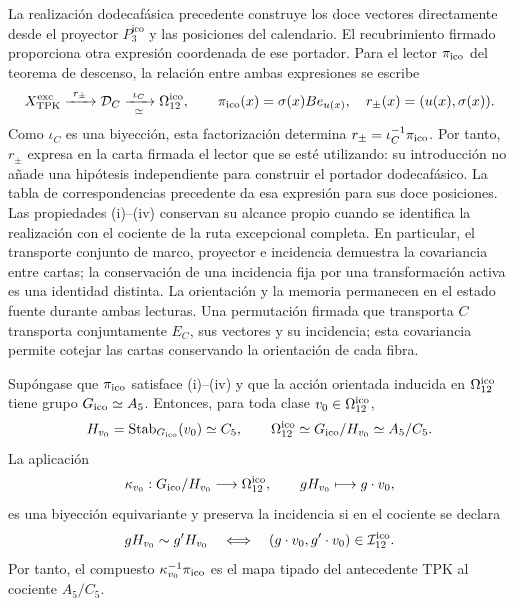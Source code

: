 La realización dodecafásica precedente construye los doce vectores
directamente desde el proyector \(P_3^{\mathrm{ico}}\) y las posiciones del calendario.
El recubrimiento firmado proporciona otra expresión coordenada de ese
portador. Para el lector \(\pi_{\rm ico}\) del teorema de descenso,
la relación entre ambas expresiones se escribe
\begin{equation}
 X_{\rm TPK}^{\rm exc}\xrightarrow{\ r_\pm\ }
 \mathcal D_C\xrightarrow[\simeq]{\ \iota_C\ }
 \Omega_{12}^{\rm ico},\qquad
 \pi_{\rm ico}(x)=\sigma(x)Be_{u(x)},\quad
 r_\pm(x)=(u(x),\sigma(x)).
 \label{ii:ii:ico:factorizacion-lector}
\end{equation}
Como \(\iota_C\) es una biyección, esta factorización determina
\(r_\pm=\iota_C^{-1}\pi_{\rm ico}\). Por tanto, \(r_\pm\) expresa
en la carta firmada el lector que se esté utilizando: su introducción
no añade una hipótesis independiente para construir el portador
dodecafásico. La tabla de correspondencias precedente da esa expresión
para sus doce posiciones. Las propiedades (i)--(iv) conservan su
alcance propio cuando se identifica la realización con el cociente
de la ruta excepcional completa. En particular, el transporte conjunto
de marco, proyector e incidencia demuestra la covariancia entre cartas;
la conservación de una incidencia fija por una transformación activa
es una identidad distinta. La orientación y la memoria permanecen
en el estado fuente durante ambas lecturas.
Una permutación firmada que transporta \(C\) transporta conjuntamente
\(E_C\), sus vectores y su incidencia; esta covariancia permite cotejar
las cartas conservando la orientación de cada fibra.



\begin{theorem}
\label{ii:ii:pent:thm:gravity-exceptional-descent}
Sup\'ongase que \(\pi_{\rm ico}\) satisface (i)--(iv) y que la acci\'on
orientada inducida en \(\Omega_{12}^{\rm ico}\) tiene grupo
\(G_{\rm ico}\simeq A_5\). Entonces, para toda clase
\(v_0\in\Omega_{12}^{\rm ico}\),
\begin{equation}
\label{ii:ii:pent:eq:gravity-icosahedral-quotient}
H_{v_0}=\operatorname{Stab}_{G_{\rm ico}}(v_0)\simeq C_5,
\qquad
\Omega_{12}^{\rm ico}\simeq G_{\rm ico}/H_{v_0}\simeq A_5/C_5.
\end{equation}
La aplicaci\'on
\begin{equation}
\label{ii:ii:pent:eq:gravity-coset-map}
\kappa_{v_0}:G_{\rm ico}/H_{v_0}\longrightarrow\Omega_{12}^{\rm ico},
\qquad gH_{v_0}\longmapsto g\cdot v_0,
\end{equation}
es una biyecci\'on equivariante y preserva la incidencia si en el cociente
se declara
\begin{equation}
\label{ii:ii:pent:eq:gravity-coset-incidence}
gH_{v_0}\sim g'H_{v_0}
\quad\Longleftrightarrow\quad
(g\cdot v_0,g'\cdot v_0)\in\mathcal I_{12}^{\rm ico}.
\end{equation}
Por tanto, el compuesto \(\kappa_{v_0}^{-1}\pi_{\rm ico}\) es el mapa
tipado del antecedente TPK al cociente \(A_5/C_5\).
\end{theorem}

